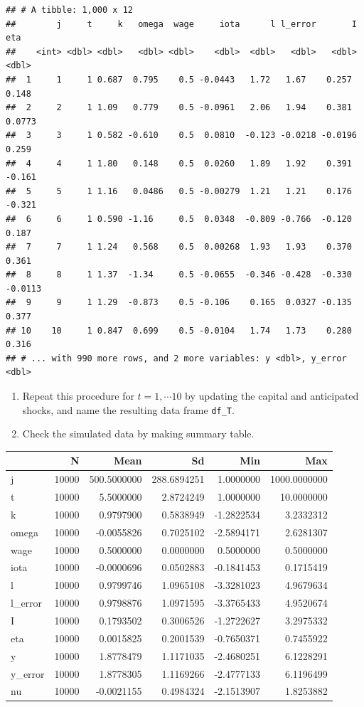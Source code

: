 \documentclass[]{book}
\begin{document}
\begin{verbatim}
## # A tibble: 1,000 x 12
##        j     t     k   omega  wage     iota      l l_error       I     eta
##    <int> <dbl> <dbl>   <dbl> <dbl>    <dbl>  <dbl>   <dbl>   <dbl>   <dbl>
##  1     1     1 0.687  0.795    0.5 -0.0443   1.72   1.67    0.257   0.148 
##  2     2     1 1.09   0.779    0.5 -0.0961   2.06   1.94    0.381   0.0773
##  3     3     1 0.582 -0.610    0.5  0.0810  -0.123 -0.0218 -0.0196  0.259 
##  4     4     1 1.80   0.148    0.5  0.0260   1.89   1.92    0.391  -0.161 
##  5     5     1 1.16   0.0486   0.5 -0.00279  1.21   1.21    0.176  -0.321 
##  6     6     1 0.590 -1.16     0.5  0.0348  -0.809 -0.766  -0.120   0.187 
##  7     7     1 1.24   0.568    0.5  0.00268  1.93   1.93    0.370   0.361 
##  8     8     1 1.37  -1.34     0.5 -0.0655  -0.346 -0.428  -0.330  -0.0113
##  9     9     1 1.29  -0.873    0.5 -0.106    0.165  0.0327 -0.135   0.377 
## 10    10     1 0.847  0.699    0.5 -0.0104   1.74   1.73    0.280   0.316 
## # ... with 990 more rows, and 2 more variables: y <dbl>, y_error <dbl>
\end{verbatim}

\begin{enumerate}
\def\labelenumi{\arabic{enumi}.}
\setcounter{enumi}{8}
\item
  Repeat this procedure for \(t = 1, \cdots 10\) by updating the capital
  and anticipated shocks, and name the resulting data frame
  \texttt{df\_T}.
\item
  Check the simulated data by making summary table.
\end{enumerate}

\begin{tabular}{l|r|r|r|r|r}
\hline
  & N & Mean & Sd & Min & Max\\
\hline
j & 10000 & 500.5000000 & 288.6894251 & 1.0000000 & 1000.0000000\\
\hline
t & 10000 & 5.5000000 & 2.8724249 & 1.0000000 & 10.0000000\\
\hline
k & 10000 & 0.9797900 & 0.5838949 & -1.2822534 & 3.2332312\\
\hline
omega & 10000 & -0.0055826 & 0.7025102 & -2.5894171 & 2.6281307\\
\hline
wage & 10000 & 0.5000000 & 0.0000000 & 0.5000000 & 0.5000000\\
\hline
iota & 10000 & -0.0000696 & 0.0502883 & -0.1841453 & 0.1715419\\
\hline
l & 10000 & 0.9799746 & 1.0965108 & -3.3281023 & 4.9679634\\
\hline
l\_error & 10000 & 0.9798876 & 1.0971595 & -3.3765433 & 4.9520674\\
\hline
I & 10000 & 0.1793502 & 0.3006526 & -1.2722627 & 3.2975332\\
\hline
eta & 10000 & 0.0015825 & 0.2001539 & -0.7650371 & 0.7455922\\
\hline
y & 10000 & 1.8778479 & 1.1171035 & -2.4680251 & 6.1228291\\
\hline
y\_error & 10000 & 1.8778305 & 1.1169266 & -2.4777133 & 6.1196499\\
\hline
nu & 10000 & -0.0021155 & 0.4984324 & -2.1513907 & 1.8253882\\
\hline
\end{tabular}
\end{document}
